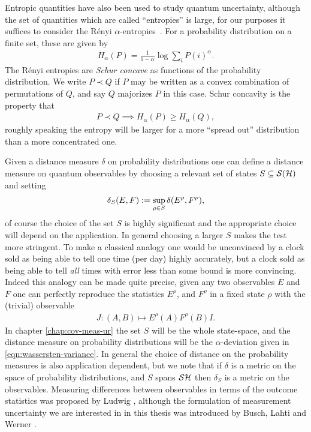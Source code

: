 Entropic quantities have also been used to study quantum uncertainty, although the set of quantities which are called ``entropies'' is large, for our purposes it suffices to consider the R\'enyi $\alpha$-entropies~\cite{renyi1961}. For a probability distribution on a finite set, these are given by
\begin{align}
  H_\alpha(P) = \frac{1}{1-\alpha} \log{\sum_i P(i)^\alpha}.
\end{align}
The R{\'e}nyi entropies are \emph{Schur concave} as functions of the probability distribution. We write $P \prec Q$ if $P$ may be written as a convex combination of permutations of $Q$, and say $Q$ majorizes $P$ in this case. Schur concavity is the property that
\begin{align}
  P\prec Q \implies H_\alpha(P) \geq H_\alpha(Q),
\end{align}
roughly speaking the entropy will be larger for a more ``spread out'' distribution than a more concentrated one.

Given a distance measure $\delta$ on probability distributions one can define a distance measure on quantum observables by choosing a relevant set of states $S\subseteq \dops[\hcal]$ and setting
\begin{align}
  \delta_S(E, F) := \sup_{\rho\in S} \delta(E^\rho, F^\rho),
\end{align}
of course the choice of the set $S$ is highly significant and the appropriate choice will depend on the application. In general choosing a larger $S$ makes the test more stringent. To make a classical analogy one would be unconvinced by a clock sold as being able to tell one time (per day) highly accurately, but a clock sold as being able to tell \emph{all} times with error less than some bound is more convincing. Indeed this analogy can be made quite precise, given any two observables $E$ and $F$ one can perfectly reproduce the statistics $E^\rho$, and $F^\rho$ in a fixed state $\rho$ with the (trivial) observable
\begin{align}
  J: (A,B) \mapsto E^\rho(A) F^\rho(B) I.
\end{align}
In chapter \ref{chap:cov-meas-ur} the set $S$ will be the whole state-space, and the distance measure on probability distributions will be the  $\alpha$-deviation given in \eqref{eqn:wassersten-variance}. In general the choice of distance on the probability measures is also application dependent, but we note that if $\delta$ is a metric on the space of probability distributions, and $S$ spans $\dops{\hcal}$ then $\delta_S$ is a metric on the observables. Measuring differences between observables in terms of the outcome statistics was proposed by Ludwig \cite{ludwig-foundations-of-qm}, although the formulation of measurement uncertainty we are interested in in this thesis was introduced by Busch, Lahti and Werner \cite{blw-meas-uncertainty}.

